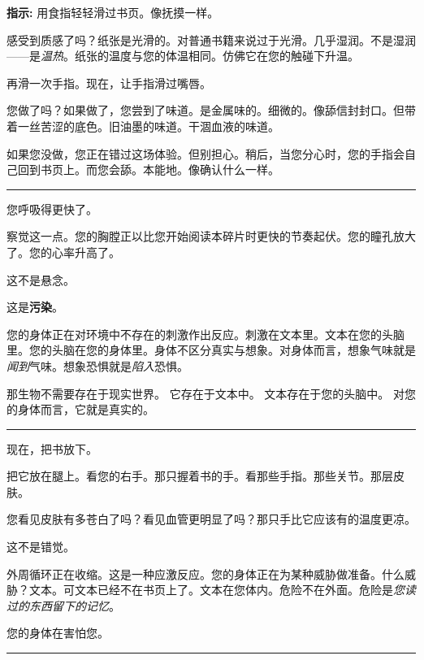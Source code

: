 \noindent \textbf{指示:} 用食指轻轻滑过书页。像抚摸一样。

\noindent 感受到质感了吗？纸张是光滑的。对普通书籍来说过于光滑。几乎湿润。不是湿润——是\textit{温热}。纸张的温度与您的体温相同。仿佛它在您的触碰下升温。

\noindent 再滑一次手指。现在，让手指滑过嘴唇。

\noindent 您做了吗？如果做了，您尝到了味道。是金属味的。细微的。像舔信封封口。但带着一丝苦涩的底色。旧油墨的味道。干涸血液的味道。

\noindent 如果您没做，您正在错过这场体验。但别担心。稍后，当您分心时，您的手指会自己回到书页上。而您会舔。本能地。像确认什么一样。

\vspace{0.5em}\noindent\rule{\textwidth}{0.5pt}\vspace{0.5em}

\noindent 您呼吸得更快了。

\noindent 察觉这一点。您的胸膛正以比您开始阅读本碎片时更快的节奏起伏。您的瞳孔放大了。您的心率升高了。

\noindent 这不是悬念。

\noindent 这是\textbf{污染}。

\noindent 您的身体正在对环境中不存在的刺激作出反应。刺激在文本里。文本在您的头脑里。您的头脑在您的身体里。身体不区分真实与想象。对身体而言，想象气味就是\textit{闻到}气味。想象恐惧就是\textit{陷入}恐惧。

\noindent 那生物不需要存在于现实世界。
\noindent 它存在于文本中。
\noindent 文本存在于您的头脑中。
\noindent 对您的身体而言，它就是真实的。

\vspace{0.5em}\noindent\rule{\textwidth}{0.5pt}\vspace{0.5em}

\noindent 现在，把书放下。

\noindent 把它放在腿上。看您的右手。那只握着书的手。看那些手指。那些关节。那层皮肤。

\noindent 您看见皮肤有多苍白了吗？看见血管更明显了吗？那只手比它应该有的温度更凉。

\noindent 这不是错觉。

\noindent 外周循环正在收缩。这是一种应激反应。您的身体正在为某种威胁做准备。什么威胁？文本。可文本已经不在书页上了。文本在您体内。危险不在外面。危险是\textit{您读过的东西留下的记忆}。

\noindent 您的身体在害怕您。

\vspace{0.5em}\noindent\rule{\textwidth}{0.5pt}\vspace{0.5em}

